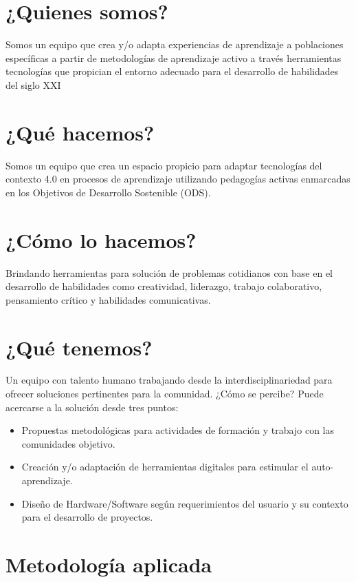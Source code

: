\section*{¿Quienes somos?}

Somos un equipo que crea y/o adapta experiencias de aprendizaje a poblaciones específicas a partir de metodologías de aprendizaje activo a través herramientas tecnologías que propician el entorno adecuado para el desarrollo de habilidades del siglo XXI


\section*{¿Qué hacemos?}

Somos un equipo que crea un espacio propicio para adaptar tecnologías del contexto 4.0 en procesos de aprendizaje utilizando pedagogías activas enmarcadas en los Objetivos de Desarrollo Sostenible (ODS).



\section*{¿Cómo lo hacemos?}
Brindando herramientas para solución de problemas cotidianos con base en el desarrollo de habilidades como  creatividad, liderazgo, trabajo colaborativo,  pensamiento crítico y habilidades comunicativas.

\section*{¿Qué tenemos?}
Un equipo con talento humano trabajando desde la interdisciplinariedad para ofrecer soluciones pertinentes para la comunidad.
¿Cómo se percibe?
Puede acercarse a la solución desde tres puntos:
\begin{itemize}
  \item Propuestas metodológicas para actividades de formación y trabajo con las comunidades objetivo.
  \item Creación y/o adaptación de herramientas digitales para estimular el auto-aprendizaje.
  \item Diseño de Hardware/Software según requerimientos del usuario y su contexto para el desarrollo de proyectos.
\end{itemize}

\section*{Metodología aplicada}

